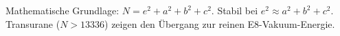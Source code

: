 \documentclass[landscape]{article}
\begin{document}
	\vfill
	\begin{center}
		\color{gray} \small 
		Mathematische Grundlage: $N = e^2 + a^2 + b^2 + c^2$. Stabil bei $e^2 \approx a^2+b^2+c^2$. \\
		Transurane ($N > 13336$) zeigen den Übergang zur reinen E8-Vakuum-Energie.
	\end{center}
	
\end{document}
